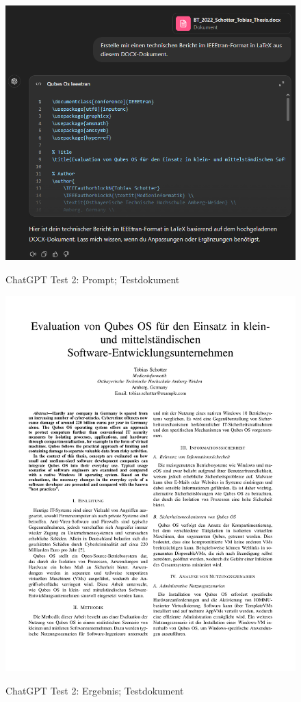 \begin{figure}[H]
\centering
\includegraphics[width=1\linewidth]{Images/DOCXzuLaTeX.png}\\
\caption{Chat\ac{GPT} Test 2: Prompt; Testdokument \cite{schotter_tobias_2022bt}}
\label{fig:docxzulatexgpt}
\end{figure}

\begin{figure}[H]
\centering
\includegraphics[width=1\linewidth]{Images/docxzulatex.pdf}\\
\caption{Chat\ac{GPT} Test 2: Ergebnis; Testdokument \cite{schotter_tobias_2022bt}}
\label{fig:docxzulatexresult}
\end{figure}

